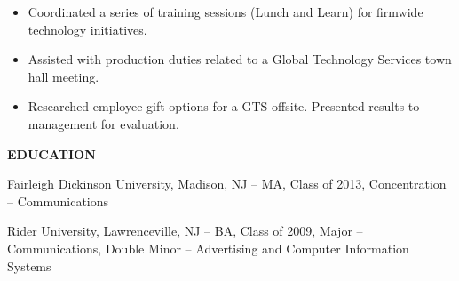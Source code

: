 \documentclass[letterpaper,12pt]{article}
\begin{document}
%
\begin{itemize}%
 \item
  Coordinated a series of training sessions (Lunch and Learn) for firmwide technology initiatives.
\item
  Assisted with production duties related to a Global Technology Services town hall meeting.
\item
  Researched employee gift options for a GTS offsite. Presented results to management for evaluation.
\end{itemize}
\begin{center}
\textbf{EDUCATION}
\end{center}
\begin{raggedright}
Fairleigh Dickinson University, Madison, NJ – MA, Class of 2013, Concentration – Communications\\
\end{raggedright}
\vspace*{0.35cm}
\begin{raggedright}
Rider University, Lawrenceville, NJ – BA, Class of 2009, Major – Communications, Double Minor – Advertising and Computer Information Systems
\end{raggedright}
\end{document}
